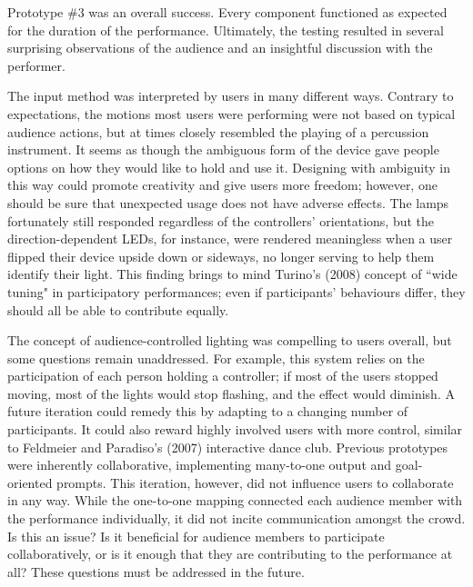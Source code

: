 Prototype \#3 was an overall success. Every component functioned as expected for the duration of the performance. Ultimately, the testing resulted in several surprising observations of the audience and an insightful discussion with the performer.

The input method was interpreted by users in many different ways. Contrary to expectations, the motions most users were performing were not based on typical audience actions, but at times closely resembled the playing of a percussion instrument. It seems as though the ambiguous form of the device gave people options on how they would like to hold and use it. Designing with ambiguity in this way could promote creativity and give users more freedom; however, one should be sure that unexpected usage does not have adverse effects. The lamps fortunately still responded regardless of the controllers' orientations, but the direction-dependent LEDs, for instance, were rendered meaningless when a user flipped their device upside down or sideways, no longer serving to help them identify their light. This finding brings to mind Turino's (2008) concept of ``wide tuning" in participatory performances; even if participants' behaviours differ, they should all be able to contribute equally.

The concept of audience-controlled lighting was compelling to users overall, but some questions remain unaddressed. For example, this system relies on the participation of each person holding a controller; if most of the users stopped moving, most of the lights would stop flashing, and the effect would diminish. A future iteration could remedy this by adapting to a changing number of participants. It could also reward highly involved users with more control, similar to Feldmeier and Paradiso's (2007) interactive dance club. Previous prototypes were inherently collaborative, implementing many-to-one output and goal-oriented prompts. This iteration, however, did not influence users to collaborate in any way. While the one-to-one mapping connected each audience member with the performance individually, it did not incite communication amongst the crowd. Is this an issue? Is it beneficial for audience members to participate collaboratively, or is it enough that they are contributing to the performance at all? These questions must be addressed in the future.

